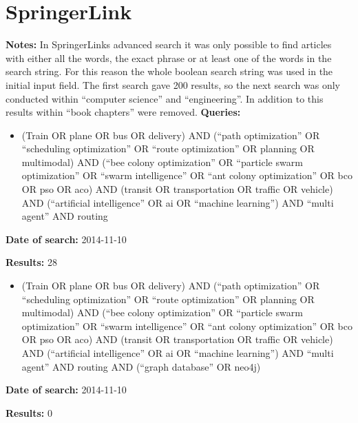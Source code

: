 \section{SpringerLink}
\textbf{Notes:} In SpringerLinks advanced search it was only possible to find articles with either all the words, the exact phrase or at least one of the words in the search string. For this reason the whole boolean search string was used in the initial input field. The first search gave 200 results, so the next search was only conducted within ``computer science'' and ``engineering''. In addition to this results within ``book chapters'' were removed.
\newline
\newline
\textbf{Queries:}
\begin{itemize}
\item (Train OR plane OR bus OR delivery) AND (``path optimization'' OR ``scheduling optimization'' OR ``route optimization'' OR planning OR multimodal) AND (``bee colony optimization'' OR ``particle swarm optimization'' OR ``swarm intelligence'' OR ``ant colony optimization'' OR bco OR pso OR aco) AND (transit OR transportation OR traffic OR vehicle) AND (``artificial intelligence'' OR ai OR ``machine learning'') AND ``multi agent'' AND routing
\end{itemize}
\par \textbf{Date of search:} 2014-11-10 
\par \textbf{Results:} 28
\begin{itemize}
\item (Train OR plane OR bus OR delivery) AND (``path optimization'' OR ``scheduling optimization'' OR ``route optimization'' OR planning OR multimodal) AND (``bee colony optimization'' OR ``particle swarm optimization'' OR ``swarm intelligence'' OR ``ant colony optimization'' OR bco OR pso OR aco) AND (transit OR transportation OR traffic OR vehicle) AND (``artificial intelligence'' OR ai OR ``machine learning'') AND ``multi agent'' AND routing AND (``graph database'' OR neo4j)
\end{itemize}
\par \textbf{Date of search:} 2014-11-10 
\par \textbf{Results:} 0


